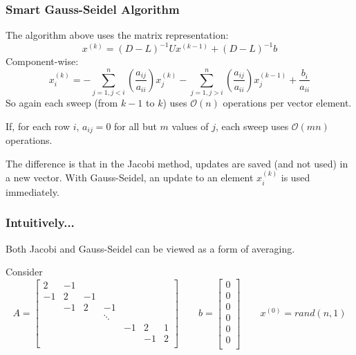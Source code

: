 \documentclass[10pt]{beamer}
\newcommand{\mO}{{\mathcal{O}}}
\begin{document}
\begin{frame}
\frametitle{Smart Gauss-Seidel Algorithm}
The algorithm above uses the matrix representation:
\begin{equation*}
x^{(k)} = (D-L)^{-1}U x^{(k-1)} + (D-L)^{-1}b
\end{equation*}
Component-wise:
\begin{equation*}
x_{i}^{(k)} = -\sum_{j=1,j < i}^{n} \left(\frac{a_{ij}}{a_{ii}}\right) x_{j}^{(k)} -\sum_{j=1,j > i}^{n} \left(\frac{a_{ij}}{a_{ii}}\right) x_{j}^{(k-1)} + \frac{b_{i}}{a_{ii}}
\end{equation*} 
So again each sweep (from $k-1$ to $k$) uses $\mO(n)$ operations per vector element.

If, for each row $i$, $a_{ij} = 0$ for all but $m$ values of $j$, each sweep 
uses $\mO(mn)$ operations.
\bigskip

The difference is that in the Jacobi method, updates are saved (and not used) in a new vector.  With Gauss-Seidel, an update to an element $x_{i}^{(k)}$ is used immediately.

\end{frame}
\begin{frame}
\frametitle{Intuitively...}
Both Jacobi and Gauss-Seidel can be viewed as a form of averaging.

\begin{example}
Consider
\begin{equation*}
A = \begin{bmatrix}
 2 & -1 &    &    &    &    &    \\
 -1& 2 & -1 &    &   &    &     \\
     & -1& 2 & -1 &  &     &     \\
     &     &    &\ddots& & &     \\
     &     &    &           & -1 & 2 & 1\\
     &    &     &           &      & -1 & 2\\
\end{bmatrix}
\qquad
b=
\begin{bmatrix}
0\\
0\\
0\\
0\\
0\\
0\\
\end{bmatrix}
\qquad
x^{(0)}=rand(n,1)
\end{equation*}
\end{example}
\end{frame}
\end{document}
